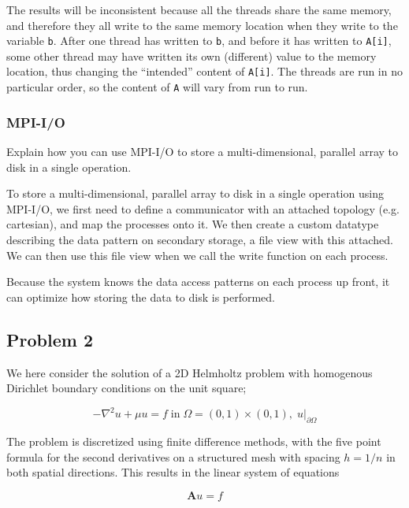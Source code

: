 The results will be inconsistent because all the threads share the same memory, and therefore they all write to the same memory location when they write to the variable \texttt{b}. After one thread has written to \texttt{b}, and before it has written to \texttt{A[i]}, some other thread may have written its own (different) value to the memory location, thus changing the ``intended'' content of \texttt{A[i]}. The threads are run in no particular order, so the content of \texttt{A}  will vary from run to run.

\subsubsection{MPI-I/O} %
\label{ssub:mpi_i_o}


\begin{question}
  Explain how you can use MPI-I/O to store a multi-dimensional, parallel array to disk in a single operation.
\end{question}

To store a multi-dimensional, parallel array to disk in a single operation using MPI-I/O, we first need to define a communicator with an attached topology (e.g. cartesian), and map the processes onto it. We then create a custom datatype describing the data pattern on secondary storage, a file view with this attached. We can then use this file view when we call the write function on each process.

Because the system knows the data access patterns on each process up front, it can optimize how storing the data to disk is performed.




\clearpage
\subsection{Problem 2} %
\label{sub:problem_2}


\begin{question}
  We here consider the solution of a 2D Helmholtz problem with homogenous Dirichlet boundary conditions on the unit square;

  \begin{equation}
    - \nabla^2 u + \mu u = f \; \text{in} \; \Omega = (0,1) \times (0,1), \; u\vert_{\partial \Omega}
  \end{equation}

  The problem is discretized using finite difference methods, with the five point formula for the second derivatives on a structured mesh with spacing $h=1/n$ in both spatial directions. This results in the linear system of equations

  \begin{equation}
    \mathbf{A}u=f
  \end{equation}
\end{question}

